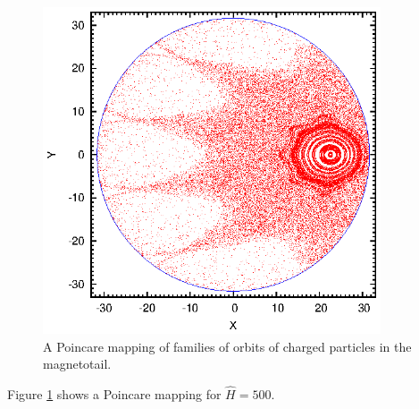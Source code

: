 \documentclass{jsarticle}
\begin{document}

\begin{figure}[htbp]
\begin{center}
\includegraphics[width=10cm]{poincare.eps}
\end{center}
\caption{A Poincare mapping of families of orbits of charged particles
in the magnetotail.\label{poincare}}
\end{figure}

Figure \ref{poincare} shows a Poincare mapping for $\hat{H}=500$.

\end{document}
